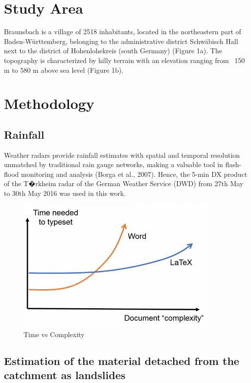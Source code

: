 \documentclass[10pt]{article}
\begin{document}
\section{Study Area}

Braunsbach is a village of 2518 inhabitants, located in the northeastern part of Baden-W{\"u}rttemberg, belonging to the administrative district Schw{\"a}bisch Hall next to the district of Hohenlohekreis (south Germany) (Figure 1a). The topography is characterized by hilly terrain with an elevation ranging from ~150 m to 580 m above sea level (Figure 1b).

\section{Methodology}

\subsection{Rainfall}

Weather radars provide rainfall estimates with spatial and temporal resolution unmatched by traditional rain gauge networks, making a valuable tool in flash-flood monitoring and analysis (Borga et al., 2007). Hence, the 5-min DX product of the T�rkheim radar of the German Weather Service (DWD) from 27th May to 30th May 2016 was used in this work. 

\begin{figure}
  \centering
    \includegraphics[width=10cm]{myplot1}
  \caption{Time vs Complexity}
\end{figure}

\subsection{Estimation of the material detached from the catchment as landslides}
\end{document}
